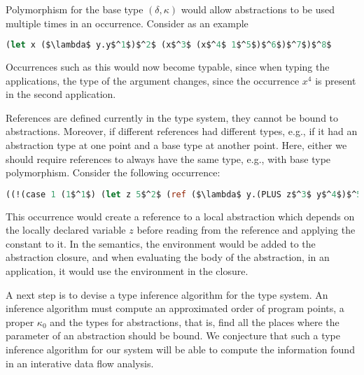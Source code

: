\documentclass{llncs}
\begin{document}
Polymorphism for the base type $(\delta,\kappa)$ would allow 
abstractions to be used multiple times in an occurrence. Consider as
an example

\begin{lstlisting}[language=Caml, mathescape=true]
(let x ($\lambda$ y.y$^1$)$^2$ (x$^3$ (x$^4$ 1$^5$)$^6$)$^7$)$^8$
\end{lstlisting}

Occurrences such as this would now become typable,
since when typing the applications, the type of the argument changes,
since the occurrence $x^4$ is present in the second application. 


References are defined currently in the type system, they cannot be bound to abstractions.
Moreover, if different references had different types, e.g., if it had an abstraction type at one point and a base type at another point.
Here, either we should require references to always have the same type, e.g., with base type polymorphism.
Consider the following occurrence:
\begin{lstlisting}[language=Caml, mathescape=true]
((!(case 1 (1$^1$) (let z 5$^2$ (ref ($\lambda$ y.(PLUS z$^3$ y$^4$)$^5$)$^6$))$^7$)$^8$)$^9$ 5)$^{10}$
\end{lstlisting}
This occurrence would create a reference to a local abstraction which depends on the locally declared variable $z$ before reading from the reference and applying the constant to it.
In the semantics, the environment would be added to the abstraction closure, and when evaluating the body of the abstraction, in an application, it would use the environment in the closure.

A next step is to devise a type inference algorithm for the type
system. An inference algorithm must compute an approximated order of
program points, a proper $\kappa_0$ and the types for abstractions,
that is, find all the places where the parameter of an abstraction
should be bound.  We conjecture that such a type inference algorithm
for our system will be able to compute the information found in an
interative data flow analysis.



\end{document}

